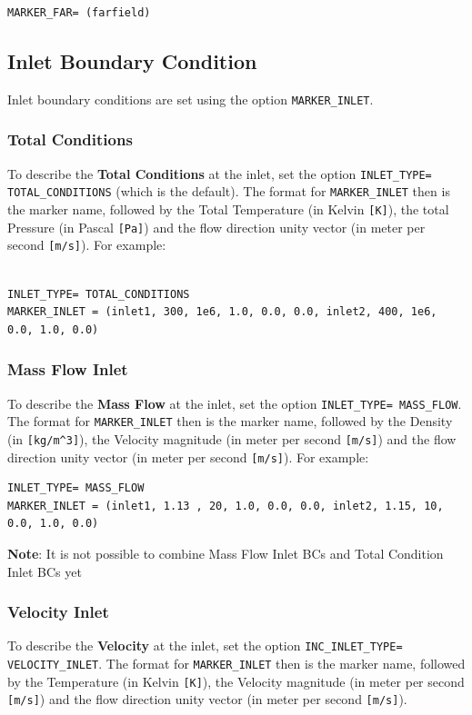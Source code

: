 \documentclass{article}
\begin{document}
\begin{lstlisting}
MARKER_FAR= (farfield)

\end{lstlisting}


\subsection{Inlet Boundary Condition}
Inlet boundary conditions are set using the option \verb|MARKER_INLET|.

\subsubsection{Total Conditions}
To describe the \textbf{Total Conditions} at the inlet, set the option \verb|INLET_TYPE= TOTAL_CONDITIONS| (which is the default). The format for \verb|MARKER_INLET| then is the marker name, followed by the Total Temperature (in Kelvin \verb|[K]|), the total Pressure (in Pascal \verb|[Pa]|) and the flow direction unity vector (in meter per second \verb|[m/s]|). For example:

\begin{lstlisting}

INLET_TYPE= TOTAL_CONDITIONS
MARKER_INLET = (inlet1, 300, 1e6, 1.0, 0.0, 0.0, inlet2, 400, 1e6, 0.0, 1.0, 0.0)

\end{lstlisting}


\subsubsection{Mass Flow Inlet}
To describe the \textbf{Mass Flow} at the inlet, set the option \verb|INLET_TYPE= MASS_FLOW|. The format for \verb|MARKER_INLET| then is the marker name, followed by the Density (in \verb|[kg/m^3]|), the Velocity magnitude (in meter per second \verb|[m/s]|) and the flow direction unity vector (in meter per second \verb|[m/s]|). For example:

\begin{lstlisting}
INLET_TYPE= MASS_FLOW
MARKER_INLET = (inlet1, 1.13 , 20, 1.0, 0.0, 0.0, inlet2, 1.15, 10, 0.0, 1.0, 0.0)

\end{lstlisting}


\textbf{Note}: It is not possible to combine Mass Flow Inlet BCs and Total Condition Inlet BCs yet

\subsubsection{Velocity Inlet}
To describe the \textbf{Velocity} at the inlet, set the option \verb|INC_INLET_TYPE= VELOCITY_INLET|. The format for \verb|MARKER_INLET| then is the marker name, followed by the Temperature (in Kelvin \verb|[K]|), the Velocity magnitude (in meter per second \verb|[m/s]|) and the flow direction unity vector (in meter per second \verb|[m/s]|).
\end{document}
